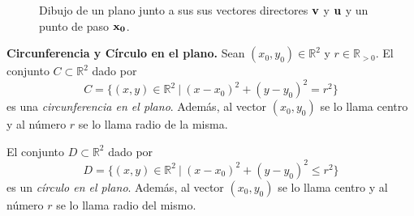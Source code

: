  \begin{figure}[H]
  \begin{center}
   \caption{Dibujo de un plano junto a sus  sus vectores directores $\vect{v}$ y $\vect{u}$ y un  punto de paso $\vect{x_0}$.}
   \end{center}
 \end{figure}
\begin{definition}{\textbf{Circunferencia y Círculo en el plano.}} 
  Sean  $(x_0,y_0) \in \mathbb{R}^2$ y $r \in \mathbb{R}_{ > 0}. $
  El conjunto $C \subset \mathbb{R}^2$ dado por
    \begin{equation}\label{circ}
    C = \{  (x,y)  \in \mathbb{R}^2 \:|\:   (x-x_0)^2+(y-y_0)^2=r^2 \}
    \end{equation}  es una \textit{circunferencia en el plano}. Adem\'as, al vector $(x_0,y_0)$  se lo llama centro y al n\'umero $r$  se lo llama radio de la misma.
   
  El conjunto $D \subset \mathbb{R}^2$ dado por
    \begin{equation*}
    D = \{  (x,y)  \in \mathbb{R}^2 \:|\:   (x-x_0)^2+(y-y_0)^2 \leq r^2 \}
    \end{equation*}  es un \textit{c\'irculo en el plano}. Adem\'as, al vector $(x_0,y_0)$  se lo llama centro y al n\'umero $r$  se lo llama radio del mismo.  
   \end{definition}
